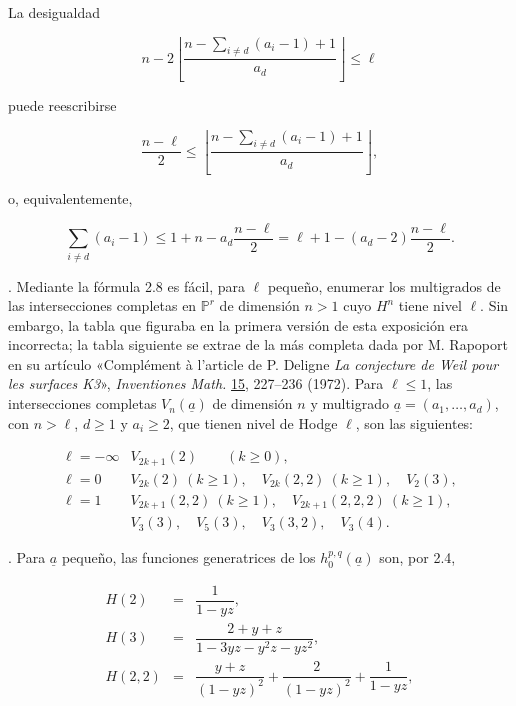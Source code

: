 La desigualdad

\begin{equation*}
n-2\left\lfloor
\frac{n-\sum_{i\ne d}(a_i-1)+1}{a_d}
\right\rfloor\leq\ell
\end{equation*}

puede reescribirse

\begin{equation*}
\frac{n-\ell}{2}
\leq
\left\lfloor
\frac{n-\sum_{i\ne d}(a_i-1)+1}{a_d}
\right\rfloor,
\end{equation*}

o, equivalentemente,

\begin{equation*}
\sum_{i\ne d}(a_i-1)
\leq1+n-a_d\frac{n-\ell}{2}
=\ell+1-(a_d-2)\frac{n-\ell}{2}.
\end{equation*}

\medskip
{}. Mediante la fórmula 2.8 es fácil, para $\ell$ pequeño,
enumerar los multigrados de las intersecciones completas en
$\mathbb P^r$ de dimensión $n>1$ cuyo $H^n$ tiene nivel $\ell$. Sin
embargo, la tabla que figuraba en la primera versión de esta exposición era
incorrecta; la tabla siguiente se extrae de la más completa dada por
M. Rapoport en su artículo «Complément à l'article de P. Deligne
\emph{La conjecture de Weil pour les surfaces K3}», \emph{Inventiones
Math.} \underline{15}, 227--236 (1972). Para $\ell\leq1$, las
intersecciones completas $V_n(\underline a)$ de dimensión $n$ y multigrado
$\underline a=(a_1,\ldots,a_d)$, con $n>\ell$, $d\geq1$ y $a_i\geq2$, que
tienen nivel de Hodge $\ell$, son las siguientes:

\pageoriginale

\begin{equation*}
\begin{array}{ll}
\ell=-\infty & V_{2k+1}(2) \qquad (k\geq0),\\[2ex]
\ell=0 & V_{2k}(2)\ (k\geq1),\quad
          V_{2k}(2,2)\ (k\geq1),\quad V_2(3),\\[2ex]
\ell=1 & V_{2k+1}(2,2)\ (k\geq1),\quad
          V_{2k+1}(2,2,2)\ (k\geq1),\\
& V_3(3),\quad V_5(3),\quad V_3(3,2),\quad V_3(4).
\end{array}
\end{equation*}

\medskip
{}. Para $\underline a$ pequeño, las funciones generatrices de
los $h_0^{p,q}(\underline a)$ son, por 2.4,

\begin{equation*}
\begin{array}{rcl}
H(2)&=&\dfrac{1}{1-yz},\\[3ex]
H(3)&=&\dfrac{2+y+z}{1-3yz-y^2z-yz^2},\\[3ex]
H(2,2)&=&\dfrac{y+z}{(1-yz)^2}
          +\dfrac{2}{(1-yz)^2}+\dfrac{1}{1-yz},
\end{array}
\end{equation*}

